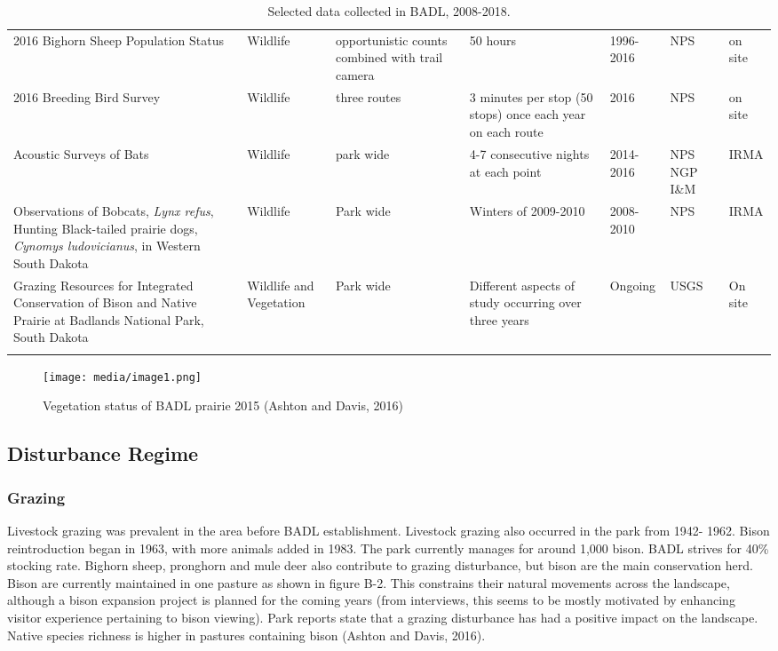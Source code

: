 \begin{longtable}[]{@{}lllllll@{}}
2016 Bighorn Sheep Population Status & Wildlife & opportunistic counts combined with trail camera & 50 hours & 1996-2016 & NPS & on site\tabularnewline
2016 Breeding Bird Survey & Wildlife & three routes & 3 minutes per stop (50 stops) once each year on each route & 2016 & NPS & on site\tabularnewline
Acoustic Surveys of Bats & Wildlife & park wide & 4-7 consecutive nights at each point & 2014-2016 & NPS NGP I\&M & IRMA\tabularnewline
Observations of Bobcats, \emph{Lynx refus}, Hunting Black-tailed prairie dogs, \emph{Cynomys ludovicianus}, in Western South Dakota & Wildlife & Park wide & Winters of 2009-2010 & 2008-2010 & NPS & IRMA\tabularnewline
Grazing Resources for Integrated Conservation of Bison and Native Prairie at Badlands National Park, South Dakota & Wildlife and Vegetation & Park wide & Different aspects of study occurring over three years & Ongoing & USGS & On site\tabularnewline
\bottomrule
\caption{Selected data collected in BADL, 2008-2018.} 
\label{tab:BADLdata}
\end{longtable}

\begin{figure}
\centering
\texttt{[image: media/image1.png]}
\caption{Vegetation status of BADL prairie 2015 (Ashton and Davis, 2016)}
\end{figure}

\subsection{Disturbance Regime }

\subsubsection{Grazing }

Livestock grazing was prevalent in the area before BADL establishment.
Livestock grazing also occurred in the park from 1942- 1962.
Bison reintroduction began in 1963, with more animals added in 1983. 
The park currently manages for around 1,000 bison. 
BADL strives for 40\% stocking rate. 
Bighorn sheep, pronghorn and mule deer also contribute to grazing disturbance, but bison are the main conservation herd. 
Bison are currently maintained in one pasture as shown in figure B-2. 
This constrains their natural movements across the landscape, although a bison expansion project is planned for the coming years (from interviews, this seems to be mostly motivated by enhancing visitor experience pertaining to bison viewing). 
Park reports state that a grazing disturbance has had a positive impact on the landscape. 
Native species richness is higher in pastures containing bison (Ashton and Davis, 2016).

